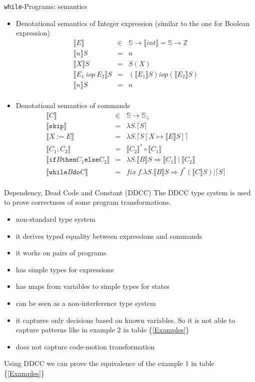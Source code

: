 \documentclass[11pt]{beamer}
\newcommand{\Z}{\mathbb{Z}}
\newcommand{\St}{\mathbb{S}}
\newcommand{\bbracket}[1]{\llbracket #1 \rrbracket}
\newcommand{\cceil}[1]{\lceil #1 \rceil}
\begin{document}
\begin{frame}{\texttt{while}-Programs: semantics}
\begin{itemize}
\item Denotational semantics of Integer expression (similar to the one for Boolean expression)
$$
\begin{array}{rcl}
\bbracket{E} &\in& \St \rightarrow \bbracket{int}=\St \rightarrow \Z\\
\bbracket{n}S &=& n\\
\bbracket{X}S &=& S(X)\\
\bbracket{E_1~iop~E_2}S &=& (\bbracket{E_1}S)iop(\bbracket{E_2}S)\\
\bbracket{n}S &=& n\\
\end{array}
$$
\item Denotational semantics of commands 
$$
\begin{array}{rcl}
\bbracket{C}&\in& \St \rightarrow \St_\perp\\
\bbracket{\texttt{skip}} &=& \lambda S.\cceil{S}\\
\bbracket{X:=E} &=& \lambda S.\cceil{S[X \mapsto \bbracket{E}S]}\\
\bbracket{C_1;C_2} &=& \bbracket{C_2}^*\circ\bbracket{C_1}\\
\bbracket{\texttt{if} B \texttt{then} C_1 \texttt{else} C_2} &=& \lambda S.\bbracket{B}S \Rightarrow \bbracket{C_1}~|~\bbracket{C_2}\\
\bbracket{\texttt{while}B\texttt{do}C} &=& fix~f.\lambda S.\bbracket{B}S \Rightarrow f^*(\bbracket{C}S)|\cceil{S}\\
\end{array}
$$
\end{itemize}
\end{frame}

\begin{frame}{Dependency, Dead Code and Constant (DDCC)}
The DDCC type system is used to prove correctness of some program transformations.
\begin{itemize}
\item non-standard type system
\item it derives typed equality between expressions and commands
\item it works on pairs of programs
\item has simple types for expressions
\item has maps from variables to simple types for states
\item can be seen as a non-interference type system 
\item it captures only decisions based on known variables. So it is not able to capture patterns like in example 2 in table \{\ref{Examples}\}
\item does not capture code-motion transformation
\end{itemize}
Using DDCC we can prove the equivalence of the example 1 in table \{\ref{Examples}\}
\end{frame}
\end{document}
